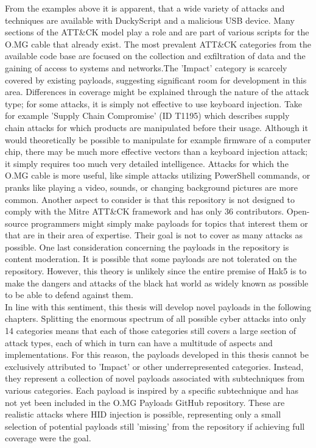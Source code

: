 From the examples above it is apparent, that a wide variety of attacks and techniques are available with DuckyScript and a malicious USB device. Many sections of the ATT\&CK model play a role and are part of various scripts for the O.MG cable that already exist. The most prevalent ATT\&CK categories from the available code base are focused on the collection and exfiltration of data and the gaining of access to systems and networks.The 'Impact' category is scarcely covered by existing payloads, suggesting significant room for development in this area.
Differences in coverage might be explained through the nature of the attack type; for some attacks, it is simply not effective to use keyboard injection. Take for example 'Supply Chain Compromise' (ID T1195) which describes supply chain attacks for which products are manipulated before their usage. Although it would theoretically be possible to manipulate for example firmware of a computer chip, there may be much more effective vectors than a keyboard injection attack; it simply requires too much very detailed intelligence. Attacks for which the O.MG cable is more useful, like simple attacks utilizing PowerShell commands, or pranks like playing a video, sounds, or changing background pictures are more common. 
Another aspect to consider is that this repository is not designed to comply with the Mitre ATT\&CK framework and has only 36 contributors. Open-source programmers might simply make payloads for topics that interest them or that are in their area of expertise. Their goal is not to cover as many attacks as possible. One last consideration concerning the payloads in the repository is content moderation. It is possible that some payloads are not tolerated on the repository. However, this theory is unlikely since the entire premise of Hak5 is to make the dangers and attacks of the black hat world as widely known as possible to be able to defend against them.\\  
In line with this sentiment, this thesis will develop novel payloads in the following chapters. Splitting the enormous spectrum of all possible cyber attacks into only 14 categories means that each of those categories still covers a large section of attack types, each of which in turn can have a multitude of aspects and implementations. For this reason, the payloads developed in this thesis cannot be exclusively attributed to 'Impact' or other underrepresented categories. Instead, they represent a collection of novel payloads associated with subtechniques from various categories. Each payload is inspired by a specific subtechnique and has not yet been included in the O.MG Payloads GitHub repository. These are realistic attacks where HID injection is possible, representing only a small selection of potential payloads still 'missing' from the repository if achieving full coverage were the goal.


